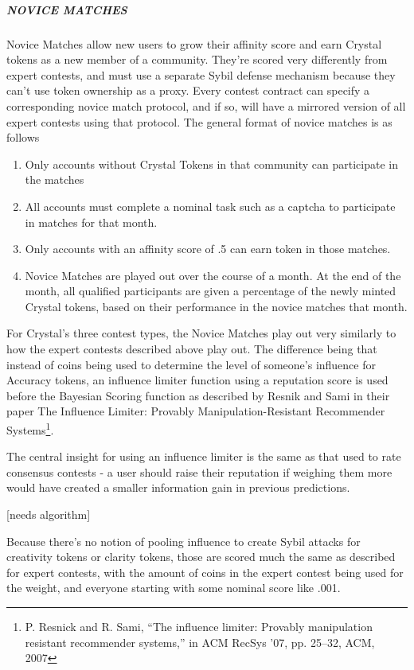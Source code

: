 \subparagraph{NOVICE MATCHES}\label{novice-matches}

Novice Matches allow new users to grow their affinity score and earn
Crystal tokens as a new member of a community. They're scored very
differently from expert contests, and must use a separate Sybil defense
mechanism because they can't use token ownership as a proxy. Every
contest contract can specify a corresponding novice match protocol, and
if so, will have a mirrored version of all expert contests using that
protocol. The general format of novice matches is as follows

\begin{enumerate}
\def\labelenumi{\arabic{enumi}.}
\item
  Only accounts without Crystal Tokens in that community can participate
  in the matches
\item
  All accounts must complete a nominal task such as a captcha to
  participate in matches for that month.
\item
  Only accounts with an affinity score of .5 can earn token in those
  matches.
\item
  Novice Matches are played out over the course of a month. At the end
  of the month, all qualified participants are given a percentage of the
  newly minted Crystal tokens, based on their performance in the novice
  matches that month.
\end{enumerate}

For Crystal's three contest types, the Novice Matches play out very
similarly to how the expert contests described above play out. The
difference being that instead of coins being used to determine the level
of someone's influence for Accuracy tokens, an influence limiter
function using a reputation score is used before the Bayesian Scoring
function as described by Resnik and Sami in their paper The Influence
Limiter: Provably Manipulation-Resistant Recommender Systems\footnote{P.
  Resnick and R. Sami, ``The influence limiter: Provably manipulation
  resistant recommender systems,'' in ACM RecSys '07, pp. 25--32, ACM,
  2007}.

The central insight for using an influence limiter is the same as that
used to rate consensus contests - a user should raise their reputation
if weighing them more would have created a smaller information gain in
previous predictions.

{[}needs algorithm{]}

Because there's no notion of pooling influence to create Sybil attacks
for creativity tokens or clarity tokens, those are scored much the same
as described for expert contests, with the amount of coins in the expert
contest being used for the weight, and everyone starting with some
nominal score like .001.

